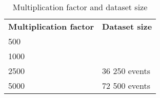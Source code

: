 \begin{table}
  \centering
  \sffamily
  \begin{tabular}{l l}
    \toprule
    \textbf{Multiplication factor} &
    \textbf{Dataset size} & \\

    \cline{1-2}

    500 &
    & \\

    \cline{1-2}

    1000 &
    & \\

    \cline{1-2}

    2500 &
    36 250 events &\\

    \cline{1-2}

    5000 &
    72 500 events & \\

    \bottomrule
  \end{tabular}

  \caption{Multiplication factor and dataset size}
  \label{tbl:dataset-size}
\end{table}
